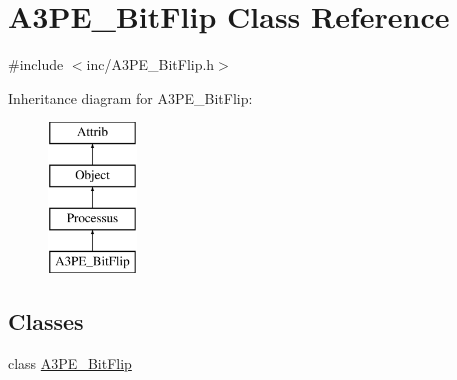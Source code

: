 \hypertarget{classA3PE__BitFlip}{}\section{A3\+P\+E\+\_\+\+Bit\+Flip Class Reference}
\label{classA3PE__BitFlip}


{\ttfamily \#include $<$inc/\+A3\+P\+E\+\_\+\+Bit\+Flip.\+h$>$}

Inheritance diagram for A3\+P\+E\+\_\+\+Bit\+Flip\+:\begin{figure}[H]
\begin{center}
\leavevmode
\includegraphics[height=4.000000cm]{classA3PE__BitFlip}
\end{center}
\end{figure}
\subsection*{Classes}
\begin{DoxyCompactItemize}
\item 
class \hyperlink{classA3PE__BitFlip_1_1A3PE__BitFlip}{A3\+P\+E\+\_\+\+Bit\+Flip}
\end{DoxyCompactItemize}
